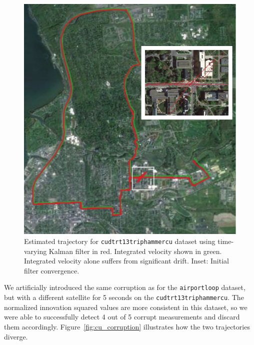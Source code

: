 \begin{figure}[!b]
\includegraphics[width=\columnwidth]{track2_map}
\caption{Estimated trajectory for \texttt{cudtrt13triphammercu} dataset using time-varying Kalman filter in red.  Integrated velocity shown in green.  Integrated velocity alone suffers from significant drift.  Inset: Initial filter convergence.}
\label{fig:track2_map}
\end{figure}

We artificially introduced the same corruption as for the \texttt{airportloop} dataset, but with a different satellite for 5 seconds on the \texttt{cudtrt13triphammercu}.  The normalized innovation squared values are more consistent in this dataset, so we were able to successfully detect 4 out of 5 corrupt measurements and discard them accordingly.  Figure~\ref{fig:cu_corruption} illustrates how the two trajectories diverge.

